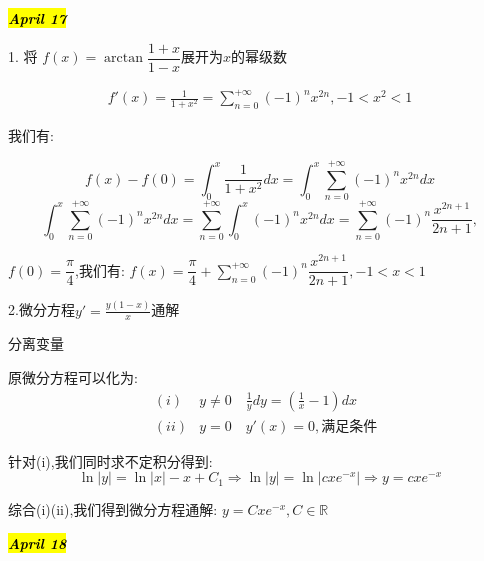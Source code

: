 \hl{\textbf{\textit{April 17}}}

1. 将 $f(x)=\arctan\dfrac{1+x}{1-x}$展开为$x$的幂级数
\begin{solution}
	\begin{eqnarray*}
		f'(x)=\frac{1}{1+x^2}=\sum\limits_{n=0}^{+\infty}(-1)^nx^{2n}, -1<x^2<1
	\end{eqnarray*}

	我们有: 
	
	$$f(x)-f(0)=\int_{0}^{x}\frac{1}{1+x^2}dx=\int_{0}^{x}\sum\limits_{n=0}^{+\infty}(-1)^nx^{2n}dx$$
	$$\int_{0}^{x}\sum\limits_{n=0}^{+\infty}(-1)^nx^{2n}dx=\sum\limits_{n=0}^{+\infty}\int_{0}^{x}(-1)^{n}x^{2n}dx=\sum\limits_{n=0}^{+\infty}(-1)^n\dfrac{x^{2n+1}}{2n+1},$$
	
	$f(0)=\dfrac{\pi}{4}$,我们有: $f(x)=\dfrac{\pi}{4}+\sum\limits_{n=0}^{+\infty}(-1)^n\dfrac{x^{2n+1}}{2n+1},-1<x<1$
	
\end{solution}

2.微分方程$y'=\frac{y(1-x)}{x}$通解
\begin{solution}
	
	分离变量
	
	原微分方程可以化为: 
	\begin{eqnarray*}
		&(i) &y\neq 0\quad\frac{1}{y}dy=(\frac{1}{x}-1)dx\\
		&(ii)&y=0\quad y'(x)=0,\text{满足条件}
	\end{eqnarray*}
	
	针对(i),我们同时求不定积分得到: 
	$$\ln|y|=\ln|x|-x+C_{1}\Rightarrow \ln|y|=\ln|cxe^{-x}|\Rightarrow y=cxe^{-x}$$
	
	综合(i)(ii),我们得到微分方程通解: $y=Cxe^{-x},C\in \mathbb{R}$
\end{solution}

\hl{\textbf{\textit{April 18}}}

